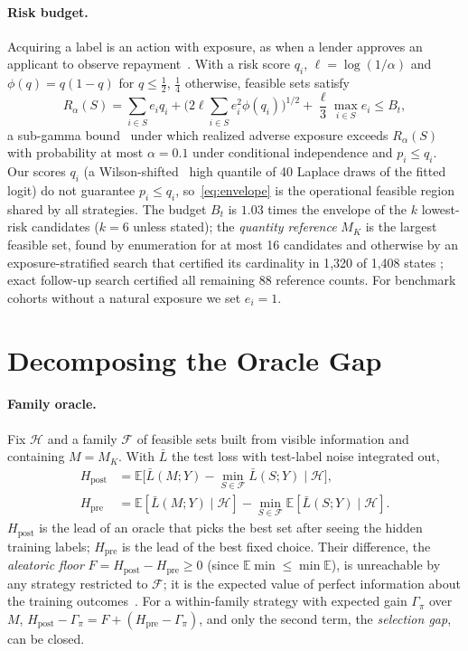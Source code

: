 \documentclass[runningheads]{llncs}
\begin{document}
\paragraph{Risk budget.} Acquiring a label is an action with exposure, as when a lender approves an applicant to observe repayment~\cite{lakkaraju2017selective,wei2021selective}. With a risk score $q_i$, $\ell=\log(1/\alpha)$ and $\phi(q)=q(1-q)$ for $q\le\frac12$, $\frac14$ otherwise, feasible sets satisfy
\begin{equation}
 R_\alpha(S)=\sum_{i\in S}e_iq_i+\Big(2\ell\sum_{i\in S}e_i^2\phi(q_i)\Big)^{1/2}+\frac{\ell}{3}\max_{i\in S}e_i\le B_t,
 \label{eq:envelope}
\end{equation}
a sub-gamma bound~\cite{boucheron2013concentration} under which realized adverse exposure exceeds $R_\alpha(S)$ with probability at most $\alpha=0.1$ under conditional independence and $p_i\le q_i$. Our scores $q_i$ (a Wilson-shifted~\cite{wilson1927probable} high quantile of 40 Laplace draws of the fitted logit) do not guarantee $p_i\le q_i$, so~\eqref{eq:envelope} is the operational feasible region shared by all strategies. The budget $B_t$ is $1.03$ times the envelope of the $k$ lowest-risk candidates ($k=6$ unless stated); the \emph{quantity reference} $M_K$ is the largest feasible set, found by enumeration for at most 16 candidates and otherwise by an exposure-stratified search that certified its cardinality in 1{,}320 of 1{,}408 states ; exact follow-up search certified all remaining 88 reference counts. For benchmark cohorts without a natural exposure we set $e_i=1$.

\section{Decomposing the Oracle Gap}
\label{sec:protocol}
\paragraph{Family oracle.} Fix $\mathcal H$ and a family $\mathcal F$ of feasible sets built from visible information and containing $M=M_K$. With $\bar L$ the test loss with test-label noise integrated out,
\begin{align}
 H_{\mathrm{post}}&=\mathbb E\big[\bar L(M;Y)-\min_{S\in\mathcal F}\bar L(S;Y)\mid\mathcal H\big],\\
 H_{\mathrm{pre}}&=\mathbb E[\bar L(M;Y)\mid\mathcal H]-\min_{S\in\mathcal F}\mathbb E[\bar L(S;Y)\mid\mathcal H].
\end{align}
$H_{\mathrm{post}}$ is the lead of an oracle that picks the best set after seeing the hidden training labels; $H_{\mathrm{pre}}$ is the lead of the best fixed choice. Their difference, the \emph{aleatoric floor} $F=H_{\mathrm{post}}-H_{\mathrm{pre}}\ge0$ (since $\mathbb E\min\le\min\mathbb E$), is unreachable by any strategy restricted to $\mathcal F$; it is the expected value of perfect information about the training outcomes~\cite{howard1966information}. For a within-family strategy with expected gain $\Gamma_\pi$ over $M$, $H_{\mathrm{post}}-\Gamma_\pi=F+(H_{\mathrm{pre}}-\Gamma_\pi)$, and only the second term, the \emph{selection gap}, can be closed.
\end{document}
